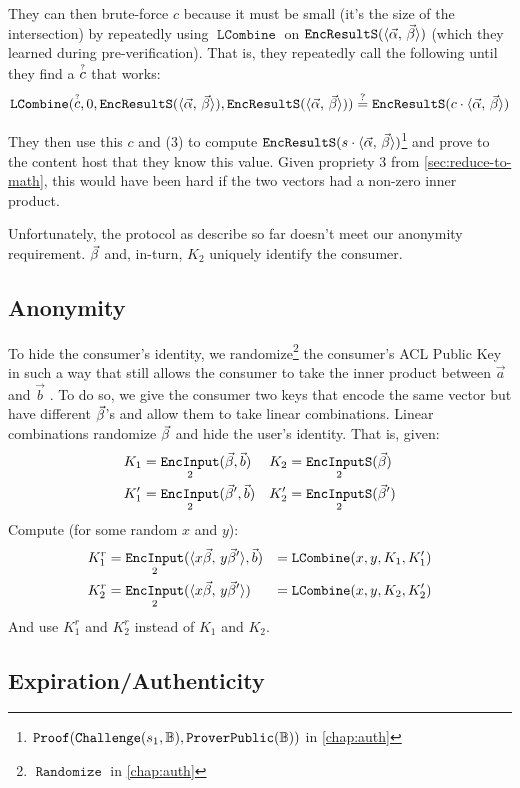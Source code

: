 \documentclass[pdftex,12pt,a4papaer,twoside,notitlepage]{report}
\newcommand{\iprod}[2]{\langle #1,\,#2\rangle}
\DeclareMathOperator{\ein}{\mathtt{EncInput}}
\DeclareMathOperator{\combine}{\mathtt{LCombine}}
\DeclareMathOperator{\eins}{\mathtt{EncInputS}}
\DeclareMathOperator{\eouts}{\mathtt{EncResultS}}
\DeclareMathOperator{\Proof}{\mathtt{Proof}}
\DeclareMathOperator{\rand}{\mathtt{Randomize}}
\begin{document}
They can then brute-force $c$ because it must be small (it's the size of the
intersection) by repeatedly using $\combine$ on $\eouts(\ABp)$ (which they
learned during pre-verification). That is, they repeatedly call the following 
until they find a $\stackrel{\text{\tiny?}}{c}$ that works:
\begin{align*}
  \combine(\stackrel{\text{\tiny ?}}{c}, 0, \eouts(\ABp), \eouts(\ABp)) \stackrel{?}{=} \eouts(c\cdot\ABp)
\end{align*}

They then use this $c$ and (3) to compute $\eouts(s\cdot\ABp)$\footnote{$\Proof(\Cv,
\Pv)$ in \cref{chap:auth}} and prove to the content host that they know this
value. Given propriety 3 from \cref{sec:reduce-to-math}, this would have been
hard if the two vectors had a non-zero inner product.

Unfortunately, the protocol as describe so far doesn't meet our anonymity
requirement. $\vec{\beta}$ and, in-turn, $K_2$ uniquely identify the consumer.

\subsection{Anonymity}
\label{sec:anon-crypto}

To hide the consumer's identity, we randomize\footnote{$\rand$ in
  \cref{chap:auth}} the consumer's ACL Public Key in such a way that still
allows the consumer to take the inner product between $\vec{a}$ and $\vec{b}$ .
To do so, we give the consumer two keys that encode the same vector but have
different $\vec{\beta}$'s and allow them to take linear combinations. Linear
combinations randomize $\vec{\beta}$ and hide the user's identity. That is, given:
\begin{align*}
  K_1 &= \ein_2(\Bp, \vec{b}) & K_2 &= \eins_2(\Bp) \\
  K^\prime_1 &= \ein_2(\Bp^\prime, \vec{b}) & K^\prime_2 &= \eins_2(\Bp^\prime)
\end{align*}
Compute (for some random $x$ and $y$):
\begin{align*}
  K^r_1 &= \ein_2(\iprod{x\Bp}{y\Bp^\prime}, \vec{b}) &= \combine(x, y, K_1, K_1^\prime) \\
  K^r_2 &= \ein_2(\iprod{x\Bp}{y\Bp^\prime}) &= \combine(x, y, K_2, K_2^\prime) \\
\end{align*}
And use $K_1^r$ and $K_2^r$ instead of $K_1$ and $K_2$.

\subsection{Expiration/Authenticity}
\end{document}
